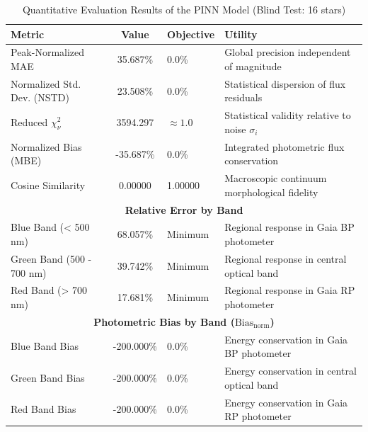 
\begin{table}[htpb]
\centering
\caption{Quantitative Evaluation Results of the PINN Model (Blind Test: 16 stars)}
\label{tab:pinn_evaluation}
\begin{tabular}{lcll}
\hline
\textbf{Metric} & \textbf{Value} & \textbf{Objective} & \textbf{Utility} \\
\hline
Peak-Normalized MAE & 35.687\% & 0.0\% & Global precision independent of magnitude \\
Normalized Std. Dev. (NSTD) & 23.508\% & 0.0\% & Statistical dispersion of flux residuals \\
Reduced $\chi^2_\nu$ & 3594.297 & $\approx 1.0$ & Statistical validity relative to noise $\sigma_i$ \\
Normalized Bias (MBE) & -35.687\% & 0.0\% & Integrated photometric flux conservation \\
Cosine Similarity & 0.00000 & 1.00000 & Macroscopic continuum morphological fidelity \\
\hline
\multicolumn{4}{c}{\textbf{Relative Error by Band}} \\
\hline
Blue Band (< 500 nm) & 68.057\% & Minimum & Regional response in Gaia BP photometer \\
Green Band (500 - 700 nm) & 39.742\% & Minimum & Regional response in central optical band \\
Red Band (> 700 nm) & 17.681\% & Minimum & Regional response in Gaia RP photometer \\
\hline
\multicolumn{4}{c}{\textbf{Photometric Bias by Band ($\text{Bias}_{\text{norm}}$)}} \\
\hline
Blue Band Bias & -200.000\% & 0.0\% & Energy conservation in Gaia BP photometer \\
Green Band Bias & -200.000\% & 0.0\% & Energy conservation in central optical band \\
Red Band Bias & -200.000\% & 0.0\% & Energy conservation in Gaia RP photometer \\
\hline
\end{tabular}
\end{table}
